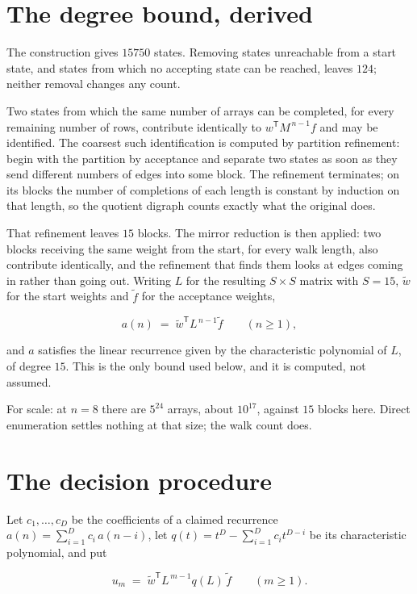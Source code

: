 \documentclass[11pt]{article}
\theoremstyle{definition}
\begin{document}
\section{The degree bound, derived}

The construction gives $15750$ states. Removing states unreachable from a start state, and states from which no accepting state can be reached, leaves $124$; neither removal changes any count.

Two states from which the same number of arrays can be completed, for every remaining number of rows, contribute identically to $w^{\mathsf T}M^{\,n-1}f$ and may be identified. The coarsest such identification is computed by partition refinement: begin with the partition by acceptance and separate two states as soon as they send different numbers of edges into some block. The refinement terminates; on its blocks the number of completions of each length is constant by induction on that length, so the quotient digraph counts exactly what the original does.

That refinement leaves $15$ blocks. The mirror reduction is then applied: two blocks receiving the same weight from the start, for every walk length, also contribute identically, and the refinement that finds them looks at edges coming in rather than going out. Writing $L$ for the resulting $S \times S$ matrix with $S = 15$, $\tilde w$ for the start weights and $\tilde f$ for the acceptance weights,

\[a(n) \;=\; \tilde w^{\mathsf T} L^{\,n-1} \tilde f \qquad (n \ge 1),\]

and $a$ satisfies the linear recurrence given by the characteristic polynomial of $L$, of degree $15$. This is the only bound used below, and it is computed, not assumed.

For scale: at $n = 8$ there are $5^{24}$ arrays, about $10^{17}$, against $15$ blocks here. Direct enumeration settles nothing at that size; the walk count does.

\section{The decision procedure}

Let $c_1,\dots,c_D$ be the coefficients of a claimed recurrence $a(n) = \sum_{i=1}^{D} c_i\,a(n-i)$, let $q(t) = t^{D} - \sum_{i=1}^{D} c_i t^{D-i}$ be its characteristic polynomial, and put

\[u_m \;=\; \tilde w^{\mathsf T} L^{\,m-1} q(L)\,\tilde f \qquad (m \ge 1).\]
\end{document}

